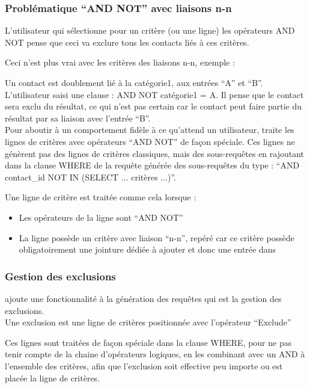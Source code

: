 \subsubsection{Problématique ``AND NOT'' avec liaisons n-n}

L'utilisateur qui sélectionne pour un critère (ou une ligne) les opérateurs AND NOT pense que ceci va exclure tous les contacts liés à ces critères.

Ceci n'est plus vrai avec les critères des liaisons n-n, exemple :

Un contact est doublement lié à la catégorie1, aux entrées ``A'' et ``B''.
L'utilisateur saisi une clause : AND NOT catégorie1 = A.
Il pense que le contact sera exclu du résultat, ce qui n'est pas certain car le contact peut faire partie du résultat par sa liaison avec l'entrée ``B''.\\

Pour aboutir à un comportement fidèle à ce qu'attend un utilisateur, \obm traite les lignes de critères avec opérateurs ``AND NOT'' de façon spéciale.
Ces lignes ne génèrent pas des lignes de critères classiques, mais des sous-requêtes en rajoutant dans la clause WHERE de la requête générée des sous-requêtes du type : ``AND contact\_id NOT IN (SELECT ... critères ...)''.

Une ligne de critère est traitée comme cela lorsque :
\begin{itemize}
\item Les opérateurs de la ligne sont ``AND NOT''
\item La ligne possède un critère avec liaison ``n-n'', repéré car ce critère possède obligatoirement une jointure dédiée à ajouter et donc une entrée dans 
\end{itemize}


\subsubsection{Gestion des exclusions}

\obm ajoute une fonctionnalité à la génération des requêtes qui est la gestion des exclusions.\\

Une exclusion est une ligne de critères positionnée avec l'opérateur ``Exclude''

Ces lignes sont traitées de façon spéciale dans la clause WHERE, pour ne pas tenir compte de la chaine d'opérateurs logiques, en les combinant avec un AND à l'ensemble des critères, afin que l'exclusion soit effective peu importe ou est placée la ligne de critères.


